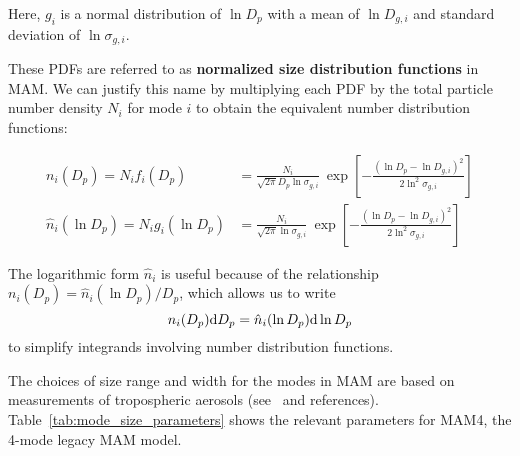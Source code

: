 Here, $g_i$ is a normal distribution of $\ln D_p$ with a mean of $\ln D_{g,i}$
and standard deviation of $\ln\sigma_{g,i}$.

These PDFs are referred to as {\bf normalized size distribution functions} in
MAM. We can justify this name by multiplying each PDF by the total particle
number density $N_i$ for mode $i$ to obtain the equivalent number distribution
functions:

\begin{align}\label{eq:log_normal_n}
  n_i(D_p) = N_i f_i(D_p) &= \frac{N_i}{\sqrt{2\pi} D_p \ln \sigma_{g,i}} \ 
  \exp \left [ - \frac{(\ln D_p - \ln D_{g,i})^2}{2\ln^2\sigma_{g,i}} \right ] \\
  \hat{n}_{i}(\ln D_p) = N_i g_i(\ln D_p) &= \frac{N_i}{\sqrt{2\pi}\ln \sigma_{g,i}} \ 
	\exp \left [ - \frac{(\ln D_p - \ln D_{g,i})^2}{2\ln^2\sigma_{g,i}} \right ]
\end{align}

The logarithmic form $\hat{n}_i$ is useful because of the relationship
$ n_i(D_p) = \hat{n}_i(\ln D_p)/D_p$, which allows us to write
\begin{equation} \labeleq{equ_norm_lognorm}
  n_i(D_p) \d{D_p} = \hat{n}_i(\ln D_p) \d{\ln D_p}
\end{equation}
to simplify integrands involving number distribution functions.

The choices of size range and width for the modes in MAM are based on
measurements of tropospheric aerosols (see~\cite{Easter2004} and references).
Table~\ref{tab:mode_size_parameters} shows the relevant parameters for MAM4,
the 4-mode legacy MAM model.

